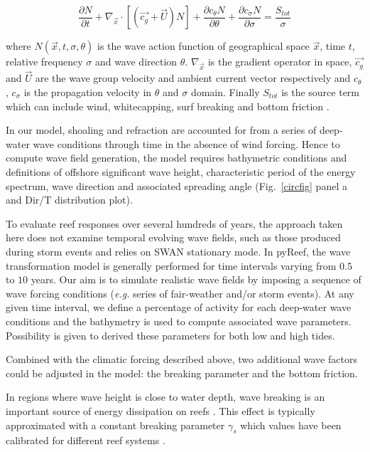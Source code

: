 \documentclass[default,jgrga]{agutex2015}
\begin{document}
\begin{article}
\begin{equation}
 \frac{\partial N}{\partial t}+\nabla_{\vec{x}} \cdot \left[ \left( \vec{c_g} + \vec{U} \right) N \right] + \frac{\partial c_{\theta}N}{\partial \theta} + \frac{\partial c_{\sigma}N}{\partial \sigma} = \frac{S_{tot}}{\sigma}
\end{equation}

\noindent where $N(\vec{x},t,\sigma,\theta)$ is the wave action function of geographical space $\vec{x}$, time $t$, relative frequency $\sigma$ and wave direction $\theta$. $\nabla_{\vec{x}}$ is the gradient operator in space, $\vec{c_g}$ and $\vec{U}$ are the wave group velocity and ambient current vector respectively and $c_{\theta}$, $c_{\sigma}$ is the propagation velocity in $\theta$ and $\sigma$ domain. Finally $S_{tot}$ is the source term which can include wind, whitecapping, surf breaking and bottom friction \citep{Booij99}.

\noindent In our model, shoaling and refraction are accounted for from a series of deep-water wave conditions through time in the absence of wind forcing. Hence to compute wave field generation, the model requires bathymetric conditions and definitions of offshore significant wave height, characteristic period of the energy spectrum, wave direction and associated spreading angle (Fig.~\ref{circfig} panel a and Dir/T distribution plot).

\noindent To evaluate reef responses over several hundreds of years, the approach taken here does not examine temporal evolving wave fields, such as those produced during storm events and relies on SWAN stationary mode. In pyReef, the wave transformation model is generally performed for time intervals varying from $0.5$ to $10$ years. Our aim is to simulate realistic wave fields by imposing a sequence of wave forcing conditions (\textit{e.g.} series of fair-weather and/or storm events). At any given time interval, we define a percentage of activity for each deep-water wave conditions and the bathymetry is used to compute associated wave parameters. Possibility is given to derived these parameters for both low and high tides.

Combined with the climatic forcing described above, two additional wave factors could be adjusted in the model: the breaking parameter and the bottom friction.

\noindent In regions where wave height is close to water depth, wave breaking is an important source of energy dissipation on reefs \citep{Symonds95, Becker14}. This effect is typically approximated with a constant breaking parameter $\gamma_s$ \citep{Symonds95, Vetter10} which values have been calibrated for different reef systems \citep{Apotsos07, Vetter10, Monismith13, Franklin13, Rogers15}.


\end{article}
\end{document}
